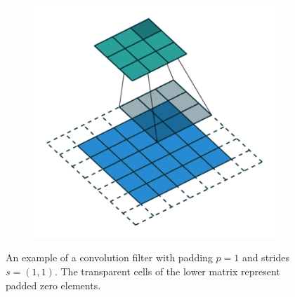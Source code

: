 \begin{figure}[h!]
\begin{subfigure}[b]{0.32\textwidth}
  \end{subfigure}
  \begin{subfigure}[b]{0.32\textwidth}
    \includegraphics[width=\textwidth]{figures/padding_strides_02}
  \end{subfigure}
  \caption{An example of a convolution filter with padding $p=1$ and strides $s = (1,1)$. The transparent cells of the lower matrix represent padded zero elements.}
  \label{fig:conv_padding_strides}
\end{figure}

